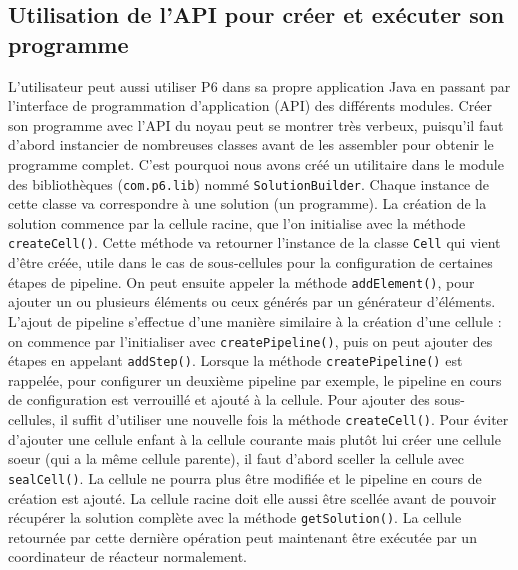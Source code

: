 \documentclass[a4paper, 12pt]{article}
\newcommand{\inline}[1]{\texttt{#1}}
\begin{document}
\subsection{Utilisation de l'API pour créer et exécuter son programme}
L’utilisateur peut aussi utiliser P6 dans sa propre application Java en passant par l’interface de programmation d’application (API) des différents modules. Créer son programme avec l’API du noyau peut se montrer très verbeux, puisqu’il faut d’abord instancier de nombreuses classes avant de les assembler pour obtenir le programme complet. C’est pourquoi nous avons créé un utilitaire dans le module des bibliothèques (\inline{com.p6.lib}) nommé \inline{SolutionBuilder}. Chaque instance de cette classe va correspondre à une solution (un programme). La création de la solution commence par la cellule racine, que l’on initialise avec la méthode \inline{createCell()}. Cette méthode va retourner l’instance de la classe \inline{Cell} qui vient d’être créée, utile dans le cas de sous-cellules pour la configuration de certaines étapes de pipeline. On peut ensuite appeler la méthode \inline{addElement()}, pour ajouter un ou plusieurs éléments ou ceux générés par un générateur d’éléments. L’ajout de pipeline s’effectue d’une manière similaire à la création d’une cellule : on commence par l’initialiser avec \inline{createPipeline()}, puis on peut ajouter des étapes en appelant \inline{addStep()}. Lorsque la méthode \inline{createPipeline()} est rappelée, pour configurer un deuxième pipeline par exemple, le pipeline en cours de configuration est verrouillé et ajouté à la cellule. Pour ajouter des sous-cellules, il suffit d’utiliser une nouvelle fois la méthode \inline{createCell()}. Pour éviter d’ajouter une cellule enfant à la cellule courante mais plutôt lui créer une cellule soeur (qui a la même cellule parente), il faut d’abord sceller la cellule avec \inline{sealCell()}. La cellule ne pourra plus être modifiée et le pipeline en cours de création est ajouté. La cellule racine doit elle aussi être scellée avant de pouvoir récupérer la solution complète avec la méthode \inline{getSolution()}. La cellule retournée par cette dernière opération peut maintenant être exécutée par un coordinateur de réacteur normalement.
\end{document}
